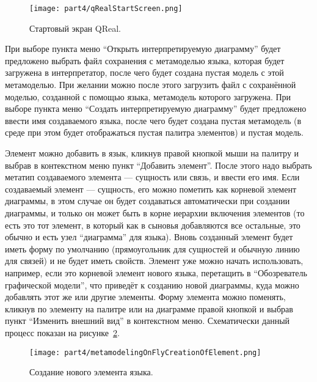 \begin{figure} [ht]
	\begin{center}
		\texttt{[image: part4/qRealStartScreen.png]}
		\caption{Стартовый экран QReal.}
		\label{image:qRealStartScreen}
	\end{center}
\end{figure}

При выборе пункта меню "`Открыть интерпретируемую диаграмму"' будет предложено выбрать 
файл сохранения с метамоделью языка, которая будет загружена в интерпретатор, после 
чего будет создана пустая модель с этой метамоделью. При желании можно после этого 
загрузить файл с сохранённой моделью, созданной с помощью языка, метамодель которого 
загружена. При выборе пункта меню "`Создать интерпретируемую диаграмму"' будет предложено 
ввести имя создаваемого языка, после чего будет создана пустая метамодель (в среде 
при этом будет отображаться пустая палитра элементов) и пустая модель.

Элемент можно добавить в язык, кликнув правой кнопкой мыши на палитру и выбрав в контекстном 
меню пункт "`Добавить элемент"'. После этого надо выбрать метатип создаваемого элемента 
--- сущность или связь, и ввести его имя. Если создаваемый элемент --- сущность, его
можно пометить как корневой элемент диаграммы, в этом случае он будет создаваться 
автоматически при создании диаграммы, и только он может быть в корне иерархии включения 
элементов (то есть это тот элемент, в который как в сыновья добавляются все остальные, 
это обычно и есть узел "`диаграмма"' для языка). Вновь созданный элемент будет иметь 
форму по умолчанию (прямоугольник для сущностей и обычную линию для связей) и не будет 
иметь свойств. Элемент уже можно начать использовать, например, если это корневой 
элемент нового языка, перетащить в "`Обозреватель графической модели"', что приведёт 
к созданию новой диаграммы, куда можно добавлять этот же или другие элементы. Форму 
элемента можно поменять, кликнув по элементу на палитре или на диаграмме правой кнопкой 
и выбрав пункт "`Изменить внешний вид"' в контекстном меню. Схематически данный процесс 
показан на рисунке~\ref{image:metamodelingOnFlyCreationOfElement}.

\begin{figure} [ht]
	\begin{center}
		\texttt{[image: part4/metamodelingOnFlyCreationOfElement.png]}
		\caption{Создание нового элемента языка.}
		\label{image:metamodelingOnFlyCreationOfElement}
	\end{center}
\end{figure}

